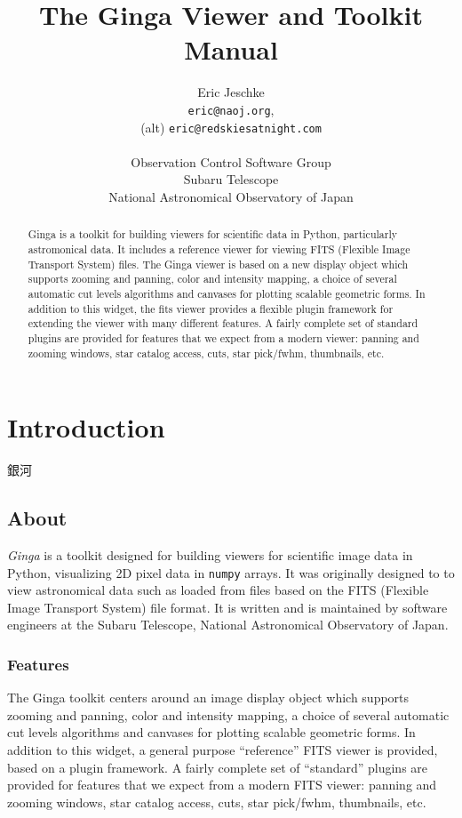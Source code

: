 \documentclass[11pt]{report}
\title{The Ginga Viewer and Toolkit Manual}
\author{Eric Jeschke\\
{\tt eric@naoj.org},\\
 (alt) {\tt eric@redskiesatnight.com}\\
\\
Observation Control Software Group\\
Subaru Telescope\\
National Astronomical Observatory of Japan}
\begin{document}
 

\maketitle 

\begin{abstract}
Ginga is a toolkit for building viewers for scientific data in Python,
particularly astromonical data.  It includes a reference viewer for
viewing FITS (Flexible Image Transport System) files.
The Ginga viewer is based on a new display object which supports 
zooming and panning, color and intensity mapping, a choice of several
automatic cut levels algorithms and canvases for plotting scalable
geometric forms.  In addition to this widget, the fits viewer provides a
flexible plugin framework for extending the viewer with many different
features.  A fairly complete set of standard plugins are provided
for features that we expect from a modern viewer: panning and zooming
windows, star catalog access, cuts, star pick/fwhm, thumbnails, etc.
\end{abstract}

\tableofcontents
\setcounter{tocdepth}{3}

\newpage

\chapter{Introduction}
\label{sh:intro}
\begin{center}
\Huge{銀河}
\end{center}


\section{About}
\label{sec:about}
\emph{Ginga} is a toolkit designed for building viewers for 
scientific image data in Python, visualizing 2D pixel data in
{\tt numpy} arrays.  It was originally designed to to view astronomical
data such as loaded from files based on the FITS (Flexible Image
Transport System) file format.  It is written and is maintained by
software engineers at the Subaru Telescope, National Astronomical
Observatory of Japan.

\subsection{Features}
The Ginga toolkit centers around an image display object which supports 
zooming and panning, color and intensity mapping, a choice of several
automatic cut levels algorithms and canvases for plotting scalable
geometric forms.  In addition to this widget, a general purpose
``reference'' FITS viewer is provided, based on a plugin framework.
A fairly complete set of ``standard'' plugins are provided for features
that we expect from a modern FITS viewer: panning and zooming windows,
star catalog access, cuts, star pick/fwhm, thumbnails, etc. 
\end{document}
